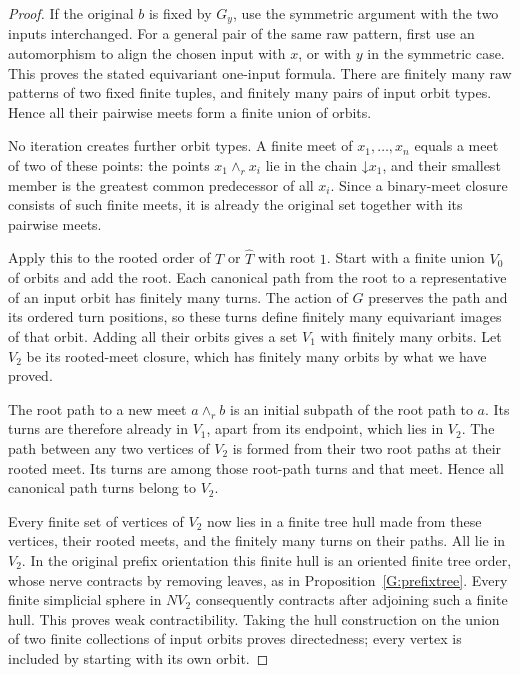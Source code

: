 \begin{proof}
If the original $b$ is fixed by $G_y$, use the symmetric
argument with the two inputs interchanged. For a general
pair of the same raw pattern, first use an automorphism to
align the chosen input with $x$, or with $y$ in the symmetric
case. This proves the stated equivariant one-input formula.
There are finitely many raw patterns of two fixed finite
tuples, and finitely many pairs of input orbit types. Hence
all their pairwise meets form a finite union of orbits.

No iteration creates further orbit types. A finite meet of
$x_1,\ldots,x_n$ equals a meet of two of these points: the
points $x_1\wedge_r x_i$ lie in the chain
$\mathord\downarrow x_1$, and their smallest member is the
greatest common predecessor of all $x_i$. Since a binary-meet
closure consists of such finite meets, it is already the
original set together with its pairwise meets.

Apply this to the rooted order of $T$ or $\widehat T$ with
root $1$. Start with a finite union $V_0$ of orbits and add
the root. Each canonical path from the root to a representative
of an input orbit has finitely many turns. The action of $G$
preserves the path and its ordered turn positions, so these
turns define finitely many equivariant images of that orbit.
Adding all their orbits gives a set $V_1$ with finitely many
orbits. Let $V_2$ be its rooted-meet closure, which has finitely
many orbits by what we have proved.

The root path to a new meet $a\wedge_r b$ is an initial
subpath of the root path to $a$. Its turns are therefore
already in $V_1$, apart from its endpoint, which lies in
$V_2$. The path between any two vertices of $V_2$ is formed
from their two root paths at their rooted meet. Its turns
are among those root-path turns and that meet. Hence all
canonical path turns belong to $V_2$.

Every finite set of vertices of $V_2$ now lies in a finite
tree hull made from these vertices, their rooted meets, and
the finitely many turns on their paths. All lie in $V_2$.
In the original prefix orientation this finite hull is an
oriented finite tree order, whose nerve contracts by removing
leaves, as in Proposition~\ref{G:prefixtree}. Every finite
simplicial sphere in $NV_2$ consequently contracts after
adjoining such a finite hull. This proves weak
contractibility. Taking the hull construction on the union
of two finite collections of input orbits proves directedness;
every vertex is included by starting with its own orbit.


\end{proof}
